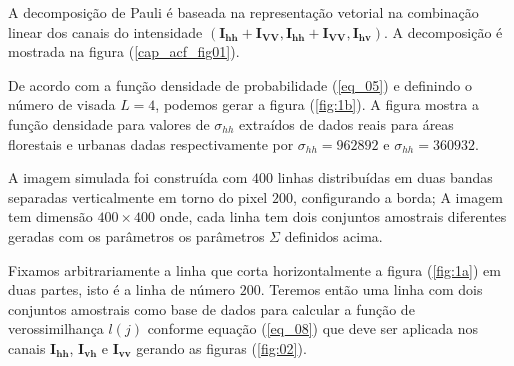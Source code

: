 \documentclass[conference]{IEEEtran}
\begin{document}
   

A decomposição de Pauli é baseada na representação vetorial na combinação linear dos canais do intensidade $(\mathbf{I_{hh}+I_{VV}}, \mathbf{I_{hh}+I_{VV}}, \mathbf{I_{hv}})$. A decomposição é mostrada na figura (\ref{cap_acf_fig01}). 

De acordo com a função densidade de probabilidade (\ref{eq_05}) e definindo o número de visada $L=4$, podemos gerar a figura (\ref{fig:1b}). A figura mostra a função densidade para valores de $\sigma_{hh}$ extraídos de dados reais para áreas florestais e urbanas dadas respectivamente por $\sigma_{hh}=962892$ e $\sigma_{hh}= 360932$. 

A imagem simulada foi construída com $400$ linhas distribuídas em duas bandas separadas verticalmente em torno do pixel $200$, configurando a borda; A imagem tem dimensão $400 \times 400$ onde, cada linha  tem dois conjuntos amostrais diferentes geradas com os parâmetros os parâmetros $\Sigma$ definidos acima.  

	Fixamos arbitrariamente a linha que corta horizontalmente a figura (\ref{fig:1a}) em duas partes, isto é a linha de número $200$. Teremos então uma linha com dois conjuntos amostrais como base de dados para calcular a função de verossimilhança $l(j)$ conforme equação (\ref{eq_08}) que deve ser aplicada nos canais $\mathbf{I_{hh}}$, $\mathbf{I_{vh}}$ e $\mathbf{I_{vv}}$ gerando as figuras (\ref{fig:02}).  
\end{document}
